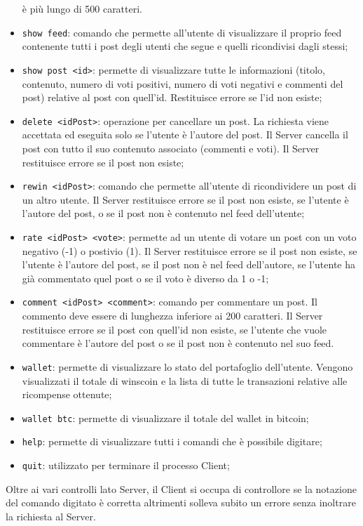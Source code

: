 \documentclass[11pt, a4paper, oneside]{article}
\begin{document}
\begin{itemize}
    è più lungo di 500 caratteri.
    \item \texttt{show feed}: comando che permette all'utente di visualizzare il proprio feed contenente tutti i post degli utenti che segue e quelli ricondivisi dagli stessi;
    \item \texttt{show post <id>}: permette di visualizzare tutte le informazioni (titolo, contenuto, numero di voti positivi, numero di voti negativi e
    commenti del post) relative al post con quell'id. Restituisce errore se l'id non esiste;
    \item \texttt{delete <idPost>}: operazione per cancellare un post. La richiesta viene accettata ed eseguita solo se l’utente è l’autore del post. Il Server cancella 
    il post con tutto il suo contenuto associato (commenti e voti). Il Server restituisce errore se il post non esiste;
    \item \texttt{rewin <idPost>}: comando che permette all'utente di ricondividere un post di un altro utente. Il Server restituisce errore se il post non esiste, se l'utente è
    l'autore del post, o se il post non è contenuto nel feed dell'utente;
    \item \texttt{rate <idPost> <vote>}: permette ad un utente di votare un post con un voto negativo (-1) o postivio (1). Il Server restituisce errore se il post non esiste, 
    se l'utente è l'autore del post, se il post non è nel feed dell'autore, se l'utente ha già commentato quel post o se il voto è diverso da 1 o -1;
    \item \texttt{comment <idPost> <comment>}: comando per commentare un post. Il commento deve essere di lunghezza inferiore ai 200 caratteri. 
    Il Server restituisce errore se il post con quell'id non esiste, se l'utente che vuole commentare
    è l'autore del post o se il post non è contenuto nel suo feed.
    \item \texttt{wallet}: permette di visualizzare lo stato del portafoglio dell'utente. Vengono visualizzati il totale di winscoin e la lista di tutte le transazioni
    relative alle ricompense ottenute;
    \item \texttt{wallet btc}: permette di visualizzare il totale del wallet in bitcoin;
    \item \texttt{help}: permette di visualizzare tutti i comandi che è possibile digitare;
    \item \texttt{quit}: utilizzato per terminare il processo Client;
\end{itemize}  
Oltre ai vari controlli lato Server, il Client si occupa di controllore se la notazione del comando digitato è corretta altrimenti solleva subito un errore senza
inoltrare la richiesta al Server.
\end{document}
